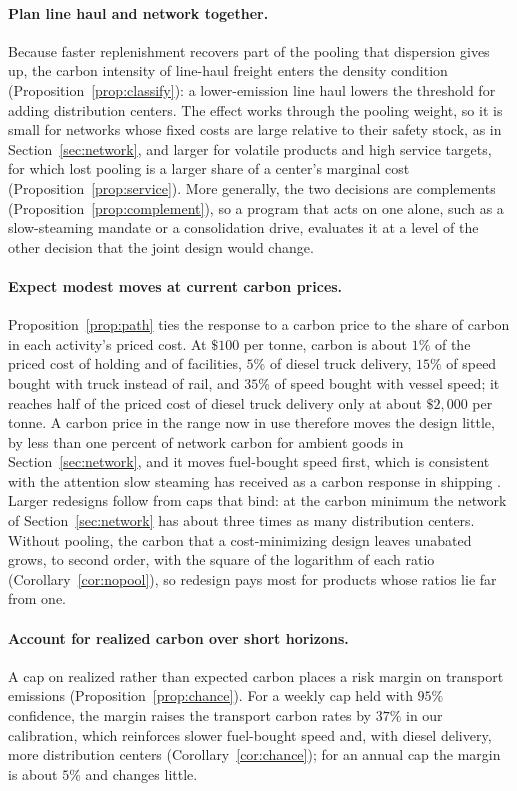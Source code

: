 \documentclass[11pt]{article}
\theoremstyle{definition}
\theoremstyle{remark}
\theoremstyle{plain}
\begin{document}
\paragraph{Plan line haul and network together.} Because faster replenishment recovers part of the pooling that
dispersion gives up, the carbon intensity of line-haul freight enters the density condition
(Proposition~\ref{prop:classify}): a lower-emission line haul lowers the threshold for adding distribution
centers. The effect works through the pooling weight, so it is small for networks whose fixed costs are large
relative to their safety stock, as in Section~\ref{sec:network}, and larger for volatile products and high service
targets, for which lost pooling is a larger share of a center's marginal cost (Proposition~\ref{prop:service}). More
generally, the two decisions are complements (Proposition~\ref{prop:complement}), so a program that acts on one
alone, such as a slow-steaming mandate or a consolidation drive, evaluates it at a level of the other decision
that the joint design would change.

\paragraph{Expect modest moves at current carbon prices.} Proposition~\ref{prop:path} ties the response to a
carbon price to the share of carbon in each activity's priced cost. At $\$100$ per tonne, carbon is about $1\%$
of the priced cost of holding and of facilities, $5\%$ of diesel truck delivery, $15\%$ of speed bought with
truck instead of rail, and $35\%$ of speed bought with vessel speed; it reaches half of the priced cost of diesel
truck delivery only at about $\$2{,}000$ per tonne. A carbon price in the range now in use therefore moves the
design little, by less than one percent of network carbon for ambient goods in Section~\ref{sec:network}, and it
moves fuel-bought speed first, which is consistent with the attention slow steaming has received as a carbon
response in shipping \citep{psaraftis2013speed}. Larger redesigns follow from caps that bind: at the carbon
minimum the network of Section~\ref{sec:network} has about three times as many distribution centers. Without
pooling, the carbon that a cost-minimizing design leaves unabated grows, to second order, with the square of the
logarithm of each ratio (Corollary~\ref{cor:nopool}), so redesign pays most for products whose ratios lie far
from one.

\paragraph{Account for realized carbon over short horizons.} A cap on realized rather than expected carbon places
a risk margin on transport emissions (Proposition~\ref{prop:chance}). For a weekly cap held with $95\%$
confidence, the margin raises the transport carbon rates by $37\%$ in our calibration, which reinforces
slower fuel-bought speed and, with diesel delivery, more distribution centers (Corollary~\ref{cor:chance}); for an
annual cap the margin is about $5\%$ and changes little.
\end{document}
